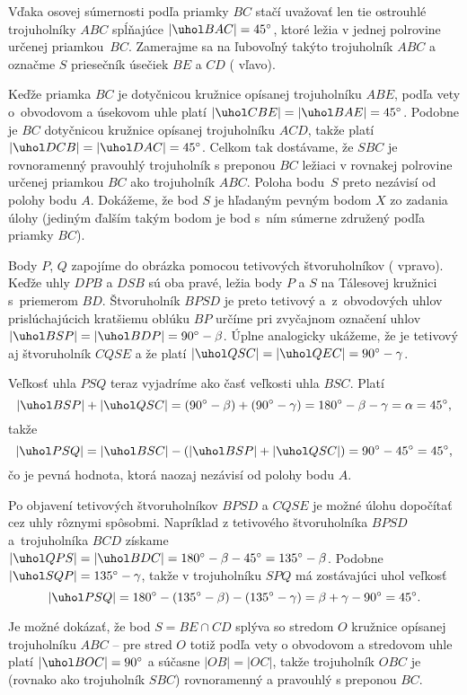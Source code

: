 {%
Vďaka osovej súmernosti podľa priamky $BC$ stačí uvažovať len tie ostrouhlé trojuholníky $ABC$ spĺňajúce $|\uhol BAC|= 45^\circ$, ktoré ležia v jednej polrovine určenej priamkou~$BC$.
Zamerajme sa na ľubovoľný takýto trojuholník $ABC$ a označme $S$ priesečník úsečiek $BE$ a $CD$ (\obr{} vľavo).

Keďže priamka $BC$ je dotyčnicou kružnice opísanej trojuholníku $ABE$, podľa vety o~obvodovom a úsekovom uhle platí $|\uhol CBE|=|\uhol BAE|=45^\circ$.
Podobne je $BC$ dotyčnicou kružnice opísanej trojuholníku $ACD$, takže platí $|\uhol DCB|=|\uhol DAC|=45^\circ$.
Celkom tak dostávame, že $SBC$ je rovnoramenný pravouhlý trojuholník s preponou $BC$ ležiaci v rovnakej polrovine určenej priamkou $BC$ ako trojuholník $ABC$. Poloha bodu~$S$ preto nezávisí od polohy bodu $A$.
Dokážeme, že bod $S$ je hľadaným pevným bodom $X$ zo zadania úlohy (jediným ďalším takým bodom je bod s~ním súmerne združený podľa priamky $BC$).
%

Body $P$, $Q$ zapojíme do obrázka pomocou tetivových štvoruholníkov ( vpravo). Keďže uhly $DPB$ a $DSB$ sú oba pravé, ležia body $P$ a $S$ na Tálesovej kružnici s~priemerom $BD$. Štvoruholník $BPSD$ je preto tetivový a~z~obvodových uhlov prislúchajúcich kratšiemu oblúku $BP$ určíme pri zvyčajnom označení uhlov $|\uhol BSP|=|\uhol BDP|=90^\circ-\beta$.
Úplne analogicky ukážeme, že je tetivový aj štvoruholník $CQSE$ a že platí $|\uhol QSC|=|\uhol QEC|=90^\circ-\gamma$.


Veľkosť uhla $PSQ$ teraz vyjadríme ako časť veľkosti uhla $BSC$.
Platí
$$|\uhol BSP|+|\uhol QSC| = (90^\circ-\beta) + (90^\circ-\gamma) = 180^\circ-\beta-\gamma=\alpha=45^\circ,
$$
takže
$$
|\uhol PSQ| = |\uhol BSC| -(|\uhol BSP|+|\uhol QSC|)=90^\circ-45^\circ=45^\circ,
$$
čo je pevná hodnota, ktorá naozaj nezávisí od polohy bodu $A$.


\poznamka
Po objavení tetivových štvoruholníkov $BPSD$ a $CQSE$ je možné úlohu dopočítať cez uhly rôznymi spôsobmi. Napríklad z tetivového štvoruholníka $BPSD$ a~trojuholníka $BCD$ získame $|\uhol QPS|=|\uhol BDC|=180^\circ-\beta-45^\circ =135^\circ-\beta$.
Podobne $|\uhol SQP|=135^\circ-\gamma$, takže v trojuholníku $SPQ$ má zostávajúci uhol veľkosť
$$
|\uhol PSQ|=180^\circ - (135^\circ-\beta)- (135^\circ-\gamma)=\beta+\gamma-90^\circ=45^\circ.
$$

\poznamka
Je možné dokázať, že bod $S=BE\cap CD$ splýva so stredom $O$ kružnice opísanej trojuholníku $ABC$ -- pre stred $O$ totiž podľa vety o obvodovom a stredovom uhle platí $|\uhol BOC|= 90^\circ$ a súčasne $|OB|=|OC|$, takže trojuholník $OBC$ je (rovnako ako trojuholník $SBC$) rovnoramenný a pravouhlý s preponou $BC$.

}
